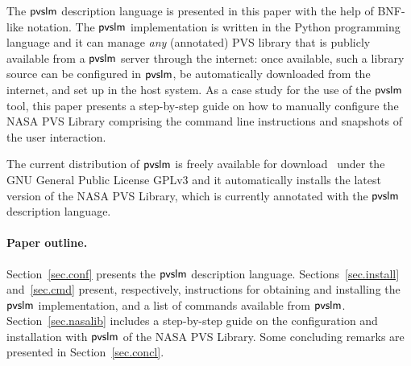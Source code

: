 The $\textsf{pvslm}$ description language is presented in this paper with the
help of BNF-like notation. The $\textsf{pvslm}$ implementation is written in
the Python programming language and it can manage {\em any}
(annotated) PVS library that is publicly available from a $\textsf{pvslm}$
server through the internet: once available, such a library source can
be configured in $\textsf{pvslm}$, be automatically downloaded from the
internet, and set up in the host system. As a case study for the use
of the $\textsf{pvslm}$ tool, this paper presents a step-by-step guide on how
to manually configure the NASA PVS Library comprising the command line
instructions and snapshots of the user interaction.

The current distribution of $\textsf{pvslm}$ is freely available for
download~\cite{pvslm} under the GNU General Public License GPLv3 and
it automatically installs the latest version of the NASA PVS Library,
which is currently annotated with the $\textsf{pvslm}$ description language.

\paragraph{Paper outline.} Section~\ref{sec.conf} presents the $\textsf{pvslm}$ 
description language. Sections~\ref{sec.install} and~\ref{sec.cmd} 
present, respectively, instructions for obtaining and installing the $\textsf{pvslm}$ 
implementation, and a list of commands available from $\textsf{pvslm}$. 
Section~\ref{sec.nasalib} includes a step-by-step guide on the configuration and
installation with $\textsf{pvslm}$ of the NASA PVS Library. Some concluding
remarks are presented in Section~\ref{sec.concl}.
